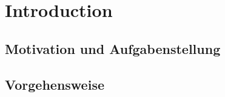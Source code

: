 \clearpage
\chapter{\textbf{Introduction}}\label{introduction}




\section{Motivation und Aufgabenstellung}






\newpage

\section{Vorgehensweise}

